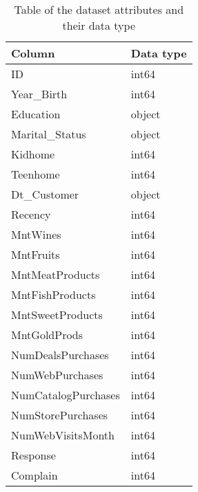 \begin{table}[H]
    \caption{Table of the dataset attributes and their data type}
    \label{tab:columns}
    \begin{tabularx}{\linewidth}{l>{\centering\arraybackslash}X}
        \toprule
        Column & Data type \\
        \midrule
        ID & int64\\
        Year\_Birth & int64\\
        Education & object\\
        Marital\_Status & object\\
        Kidhome & int64\\
        Teenhome & int64\\
        Dt\_Customer & object\\
        Recency & int64\\
        MntWines & int64\\
        MntFruits & int64\\
        MntMeatProducts & int64\\
        MntFishProducts & int64\\
        MntSweetProducts & int64\\
        MntGoldProds & int64\\
        NumDealsPurchases & int64\\
        NumWebPurchases & int64\\
        NumCatalogPurchases & int64\\
        NumStorePurchases & int64\\
        NumWebVisitsMonth & int64\\
        Response & int64\\
        Complain & int64\\
        \bottomrule
    \end{tabularx}
\end{table}

